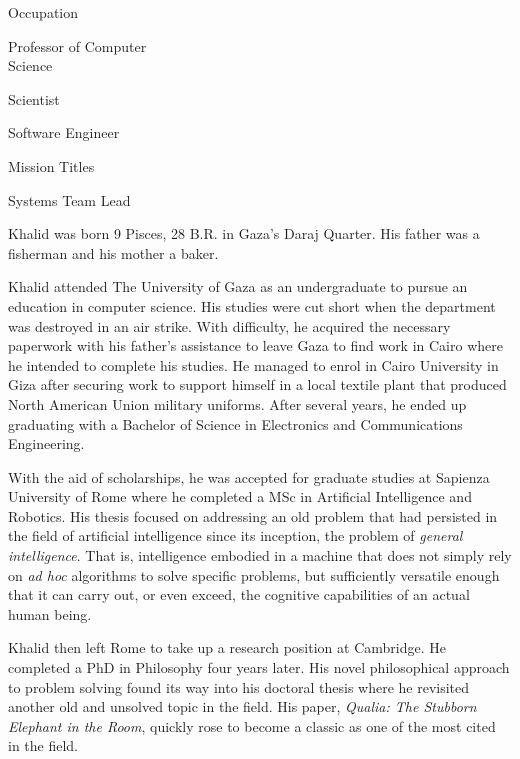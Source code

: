 {        \bTR
            \bTC Occupation \eTC
            \bTC 
                \startitemize[4]
                \startpacked
                \item Professor of Computer\\Science
                \item Scientist
                \item Software Engineer
                \stoppacked
                \stopitemize
            \eTC
        \eTR
        
        \bTR
            \bTC Mission Titles \eTC
            \bTC 
                \startitemize[4]
                \startpacked
                \item Systems Team Lead
                \stoppacked
                \stopitemize
            \eTC
        \eTR
    \eTABLEbody

\eTABLE
}

Khalid was born 9 Pisces, 28 B.R. in Gaza's Daraj Quarter. His father was a fisherman and his mother a baker.

Khalid attended The University of Gaza as an undergraduate to pursue an education in computer science. His studies were cut short when the department was destroyed in an air strike. With difficulty, he acquired the necessary paperwork with his father's assistance to leave Gaza to find work in Cairo where he intended to complete his studies. He managed to enrol in Cairo University in Giza after securing work to support himself in a local textile plant that produced North American Union military uniforms. After several years, he ended up graduating with a Bachelor of Science in Electronics and Communications Engineering. 

With the aid of scholarships, he was accepted for graduate studies at Sapienza University of Rome where he completed a MSc in Artificial Intelligence and Robotics. His thesis focused on addressing an old problem that had persisted in the field of artificial intelligence since its inception, the problem of {\it general intelligence}. That is, intelligence embodied in a machine that does not simply rely on {\it ad hoc} algorithms to solve specific problems, but sufficiently versatile enough that it can carry out, or even exceed, the cognitive capabilities of an actual human being.

Khalid then left Rome to take up a research position at Cambridge. He completed a PhD in Philosophy four years later. His novel philosophical approach to problem solving found its way into his doctoral thesis where he revisited another old and unsolved topic in the field. His paper, {\it Qualia: The Stubborn Elephant in the Room}, quickly rose to become a classic as one of the most cited in the field.


